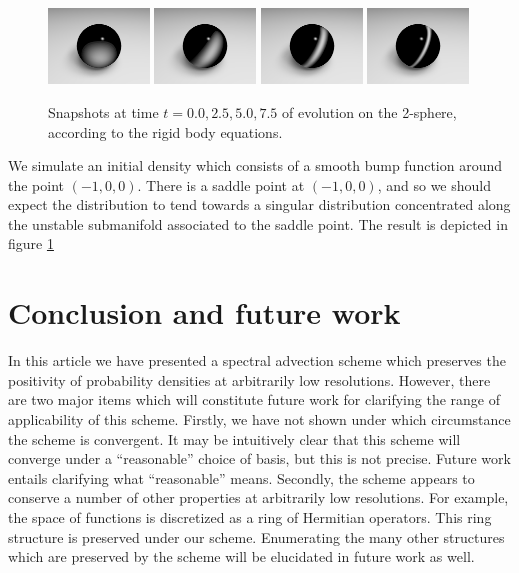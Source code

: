 \documentclass[letterpaper, 12 pt]{amsart}
\begin{document}
\begin{figure}[h]
  \centering
  \includegraphics[width=0.24\textwidth]{./images/sphere_t0}
  \includegraphics[width=0.24\textwidth]{./images/sphere_t2p5}
  \includegraphics[width=0.24\textwidth]{./images/sphere_t5}
  \includegraphics[width=0.24\textwidth]{./images/sphere_t7p5}
  \caption{Snapshots at time $t=0.0,2.5,5.0,7.5$ of evolution on the 2-sphere, according to the rigid body equations.}
  \label{fig:sphere}
\end{figure}

We simulate an initial density which consists of 
a smooth bump function around the point $(-1,0,0)$.
There is a saddle point at $(-1,0,0)$, and so 
we should expect the distribution to tend towards
a singular distribution concentrated along the unstable
submanifold associated to the saddle point.
The result is depicted in figure \ref{fig:sphere}



\section{Conclusion and future work}
In this article we have presented a spectral advection scheme which preserves the positivity of probability densities at arbitrarily low resolutions.
However, there are two major items which will constitute future work
for clarifying the range of applicability of this scheme.
Firstly, we have not shown under which circumstance the scheme is
 convergent.
It may be intuitively clear that this scheme will converge
under a ``reasonable'' choice of basis, but this is not precise.
Future work entails clarifying what ``reasonable'' means.
Secondly, the scheme appears to conserve a number of other
properties at arbitrarily low resolutions.
For example, the space of functions is discretized as
a ring of Hermitian operators.
This ring structure is preserved under our scheme.
Enumerating the many other structures which are preserved 
by the scheme will be elucidated in future work as well.
\end{document}
